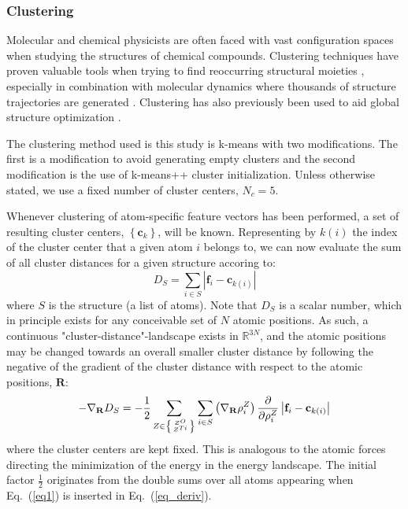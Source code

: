 \documentclass[aip,amsmath,amssymb,reprint]{revtex4-1}
\begin{document}
\subsubsection{Clustering}
Molecular and chemical physicists are often faced with vast configuration spaces when studying the structures of chemical compounds. Clustering techniques have proven valuable tools when trying to find reoccurring structural moieties \cite{Gilbert2006}, especially in combination with molecular dynamics where thousands of structure trajectories are generated \cite{Duan2010,Chema2003}. Clustering has also previously been used to aid global structure optimization \cite{Jorgensen2017}.

The clustering method used is this study is k-means with two
modifications. The first is a modification to avoid generating empty
clusters \cite{Malay2009} and the second modification is the use of
k-means++ cluster initialization. Unless otherwise stated, we use a fixed number
of cluster centers, $N_c=5$.

Whenever clustering of atom-specific feature vectors has been
performed, a set of resulting cluster centers,
$\left\{\mathbf{c}_k\right\}$, will be known. Representing by $k(i)$ the
index of the cluster center that a given atom $i$ belongs to, we can
now evaluate the sum of all cluster distances for a given structure accoring to:
\begin{equation}
D_S = \sum_{i \in S} \left|\mathbf f_i- \mathbf c_{k(i)}\right| \label{eq4}
\end{equation}
where $S$ is the structure (a list of atoms). Note that $D_S$ is a
scalar number, which in principle exists for any conceivable set of
$N$ atomic positions. As such, a continuous
"cluster-distance"-landscape exists in $\mathbb{R}^{3N}$, and the
atomic positions may be changed towards an overall smaller cluster
distance by following the negative of the gradient of the cluster distance with
respect to the atomic positions, $\mathbf{R}$:
\begin{equation}\label{eq_deriv}
-\nabla_\mathbf{R} D_S =-\frac{1}{2}\sum_{Z \in \left\{ Z^O \atop Z^{Ti}\right\} }\sum_{i \in S} \left(\nabla_\mathbf{R}\rho_i^Z\right)
\frac{\partial}{\partial\rho_i^Z}\left|\mathbf f_i- \mathbf c_{k(i)}\right|
\end{equation}
where the cluster centers are kept fixed. This is analogous to the
atomic forces directing the minimization of the energy in the energy
landscape. The initial factor $\frac{1}{2}$ originates from the double sums over all atoms appearing when Eq.\ (\ref{eq1}) is inserted in Eq.\ (\ref{eq_deriv}).
\end{document}
